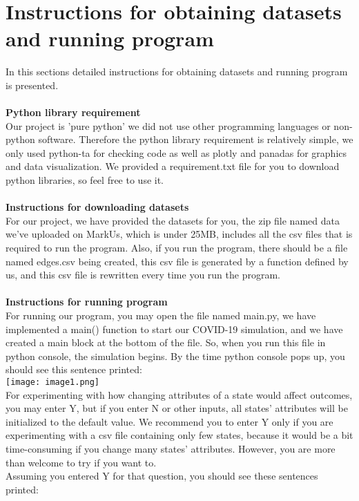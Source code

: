 \documentclass[12pt]{article}
\begin{document}
\newpage
\section{Instructions for obtaining datasets and running program}
In this sections detailed instructions for obtaining datasets and running program is presented.\\\\
\textbf{Python library requirement}\\
Our project is 'pure python' we did not use other programming languages or non-python software. Therefore the python library requirement is relatively simple, we only used python-ta for checking code as well as plotly and panadas for graphics and data visualization. We provided a requirement.txt file for you to download python libraries, so feel free to use it.\\\\
\textbf{Instructions for downloading datasets}\\
For our project, we have provided the datasets for you, the zip file named data we've uploaded on MarkUs, which is under 25MB, includes all the csv files that is required to run the program. Also, if you run the program, there should be a file named edges.csv being created, this csv file is generated by a function defined by us, and this csv file is rewritten every time you run the program.\\\\
\textbf{Instructions for running program}\\
For running our program, you may open the file named main.py, we have implemented a main() function to start our COVID-19 simulation, and we have created a main block at the bottom of the file. So, when you run this file in python console, the simulation begins.
By the time python console pops up, you should see this sentence printed:\\
\texttt{[image: image1.png]}\\
For experimenting with how changing attributes of a state would affect outcomes, you may enter Y, but if you enter N or other inputs, all states' attributes will be initialized to the default value. We recommend you to enter Y only if you are experimenting with a csv file containing only few states, because it would be a bit time-consuming if you change many states' attributes. However, you are more than welcome to try if you want to.\\
Assuming you entered Y for that question, you should see these sentences printed:\\
\end{document}
